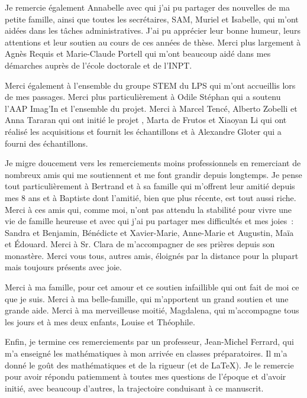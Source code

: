 \begin{fullwidth}
    Je remercie également Annabelle avec qui j'ai pu partager des nouvelles de ma petite famille, ainsi que toutes les secrétaires, SAM, Muriel et Isabelle, qui m'ont aidées dans les tâches administratives. J'ai pu apprécier leur bonne humeur, leurs attentions et leur soutien au cours de ces années de thèse. Merci plus largement à Agnès Requis et Marie-Claude Portell qui m'ont beaucoup aidé dans mes démarches auprès de l'école doctorale et de l'INPT. 
    
    Merci également à l'ensemble du groupe STEM du LPS qui m'ont accueillis lors de mes passages. Merci plus particulièrement à Odile Stéphan qui a soutenu l'AAP Imag'In et l'ensemble du projet. Merci à Marcel Tencé, Alberto Zobelli et Anna Tararan qui ont initié le projet , Marta de Frutos et Xiaoyan Li qui ont réalisé les acquisitions et fournit les échantillons et à Alexandre Gloter qui a fourni des échantillons.
    
    Je migre doucement vers les remerciements moins professionnels en remerciant de nombreux amis qui me soutiennent et me font grandir depuis longtemps. Je pense tout particulièrement à Bertrand et à sa famille qui m'offrent leur amitié depuis mes 8 ans et à Baptiste dont l'amitié, bien que plus récente, est tout aussi riche. Merci à ces amis qui, comme moi, n'ont pas attendu la stabilité pour vivre une vie de famille heureuse et avec qui j'ai pu partager mes difficultés et mes joies~: Sandra et Benjamin, Bénédicte et Xavier-Marie, Anne-Marie et Augustin, Maïa et \'Edouard. Merci à Sr. Clara de m'accompagner de ses prières depuis son monastère. Merci vous tous, autres amis, éloignés par la distance pour la plupart mais toujours présents avec joie.
    
    Merci à ma famille, pour cet amour et ce soutien infaillible qui ont fait de moi ce que je suis. Merci à ma belle-famille, qui m'apportent un grand soutien et une grande aide. Merci à ma merveilleuse moitié, Magdalena, qui m'accompagne tous les jours et à mes deux enfants, Louise et Théophile.
    
    Enfin, je termine ces remerciements par un professeur, Jean-Michel Ferrard, qui m'a enseigné les mathématiques à mon arrivée en classes préparatoires. Il m'a donné le goût des mathématiques et de la rigueur (et de \LaTeX). Je le remercie pour avoir répondu patiemment à toutes mes questions de l'époque et d'avoir initié, avec beaucoup d'autres, la trajectoire conduisant à ce manuscrit. 
    
\end{fullwidth}

